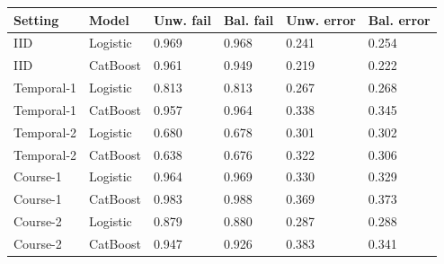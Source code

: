 \begin{tabular}{llllll}
\toprule
Setting & Model & Unw. fail & Bal. fail & Unw. error & Bal. error\\
\midrule
IID & Logistic & 0.969 & 0.968 & 0.241 & 0.254\\
IID & CatBoost & 0.961 & 0.949 & 0.219 & 0.222\\
Temporal-1 & Logistic & 0.813 & 0.813 & 0.267 & 0.268\\
Temporal-1 & CatBoost & 0.957 & 0.964 & 0.338 & 0.345\\
Temporal-2 & Logistic & 0.680 & 0.678 & 0.301 & 0.302\\
Temporal-2 & CatBoost & 0.638 & 0.676 & 0.322 & 0.306\\
Course-1 & Logistic & 0.964 & 0.969 & 0.330 & 0.329\\
Course-1 & CatBoost & 0.983 & 0.988 & 0.369 & 0.373\\
Course-2 & Logistic & 0.879 & 0.880 & 0.287 & 0.288\\
Course-2 & CatBoost & 0.947 & 0.926 & 0.383 & 0.341\\
\bottomrule
\end{tabular}